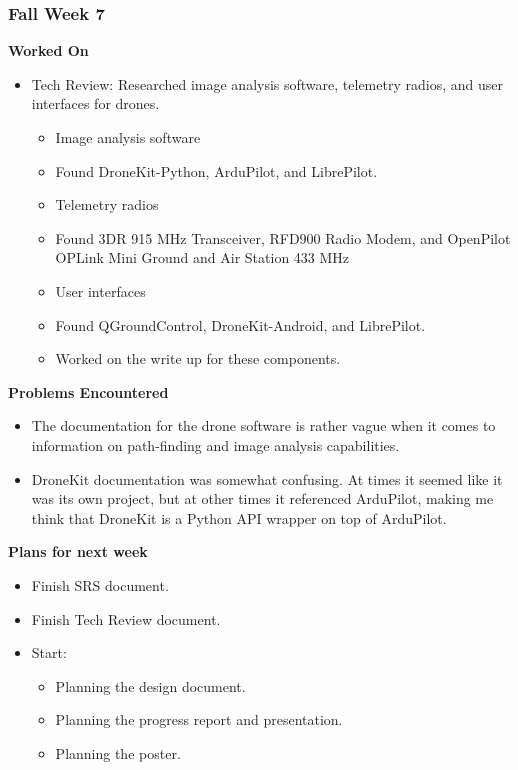 \documentclass[compsoc,draftclsnofoot,onecolumn,10pt]{IEEEtran}
\begin{document}
\subsubsection*{Fall Week 7}
\textbf{Worked On}
\begin{itemize}
    \item Tech Review: Researched image analysis software, telemetry radios, and user interfaces for drones.
    \begin{itemize}
        \item Image analysis software
        \item Found DroneKit-Python, ArduPilot, and LibrePilot.
        \item Telemetry radios
        \item Found 3DR 915 MHz Transceiver, RFD900 Radio Modem, and OpenPilot OPLink Mini Ground and Air Station 433 MHz
        \item User interfaces
        \item Found QGroundControl, DroneKit-Android, and LibrePilot.
        \item Worked on the write up for these components.
    \end{itemize}
\end{itemize}
\textbf{Problems Encountered}
\begin{itemize}
    \item The documentation for the drone software is rather vague when it comes to information on path-finding and image analysis capabilities.
    \item DroneKit documentation was somewhat confusing. At times it seemed like it was its own project, but at other times it referenced ArduPilot, making me think that DroneKit is a Python API wrapper on top of ArduPilot.
\end{itemize}
\textbf{Plans for next week}
\begin{itemize}
    \item Finish SRS document.
    \item Finish Tech Review document.
    \item Start:
    \begin{itemize}
        \item Planning the design document.
        \item Planning the progress report and presentation.
        \item Planning the poster.
    \end{itemize}
\end{itemize}
\end{document}
